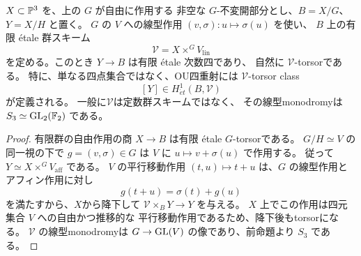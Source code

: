 \begin{proposition}
\label{prop:qa-ou-twisted-fourfold-torsor}
$X\subset\mathbb P^3$ を、上の $G$ が自由に作用する
非空な $G$-不変開部分とし、$B=X/G$、
$Y=X/H$ と置く。
$G$ の $V$ への線型作用
$(v,\sigma):u\mapsto\sigma(u)$ を使い、
$B$ 上の有限 étale 群スキーム
\[
 \mathcal V=X\times^{G}V_{\mathrm{lin}}
 \tag{OU-V}\label{eq:qa-ou-twisted-sign-local-system}
\]
を定める。このとき $Y\to B$ は有限 étale 次数四であり、
自然に $\mathcal V$-torsorである。
特に、単なる四点集合ではなく、OU四重射には
$\mathcal V$-torsor class
\[
 [Y]\in H^1_{\acute et}(B,\mathcal V)
 \tag{OU-class}\label{eq:qa-ou-torsor-class}
\]
が定義される。
一般に$\mathcal V$は定数群スキームではなく、
その線型monodromyは $S_3\simeq\operatorname{GL}_2(\mathbb F_2)$ である。
\end{proposition}
\begin{proof}
有限群の自由作用の商 $X\to B$ は有限 étale
$G$-torsorである。
$G/H\simeq V$ の同一視の下で
$g=(v,\sigma)\in G$ は $V$ に
$u\mapsto v+\sigma(u)$ で作用する。
従って $Y\simeq X\times^G V_{\mathrm{aff}}$ である。
$V$ の平行移動作用
$(t,u)\mapsto t+u$ は、$G$ の線型作用とアフィン作用に対し
\[
 g(t+u)=\sigma(t)+g(u)
\]
を満たすから、$X$から降下して
$\mathcal V\times_B Y\to Y$ を与える。
$X$ 上でこの作用は四元集合 $V$ への自由かつ推移的な
平行移動作用であるため、降下後もtorsorになる。
$\mathcal V$ の線型monodromyは
$G\to\operatorname{GL}(V)$ の像であり、前命題より $S_3$ である。
\end{proof}

